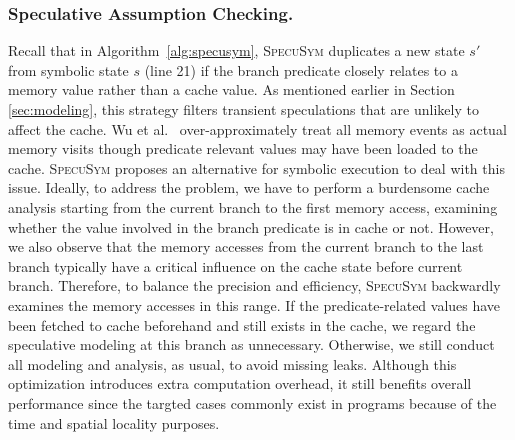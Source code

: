 \documentclass[sigconf]{acmart}
\newcommand\ignore[1]{}
\newcommand{\SpecuSym}{\textsc{SpecuSym} }
\begin{document}
\subsubsection{Speculative Assumption Checking.}
Recall that in Algorithm~\ref{alg:specusym}, \SpecuSym duplicates a new state 
$s'$ from symbolic state $s$ (line 21) if the branch predicate closely relates 
to a memory value rather than a cache value. As mentioned earlier in Section
\ref{sec:modeling}, this strategy filters transient speculations that are unlikely 
to affect the cache. Wu et al.~\cite{WuW19} over-approximately treat all memory 
events as actual memory visits though predicate relevant values may have been 
loaded to the cache. \SpecuSym proposes an alternative for symbolic execution to 
deal with this issue. Ideally, to address the problem, we have to perform a 
burdensome cache analysis starting from the current branch to the first memory 
access, examining whether the value involved in the branch predicate is in cache 
or not. However, we also observe that the memory accesses from the current branch 
to the last branch typically have a critical influence on the cache state before 
current branch. Therefore, to balance the precision and efficiency, \SpecuSym 
backwardly examines the memory accesses in this range. If the predicate-related 
values have been fetched to cache beforehand and still exists in the cache, we 
regard the speculative modeling at this branch as unnecessary. Otherwise, we still 
conduct all modeling and analysis, as usual, to avoid missing leaks. Although this 
optimization introduces extra computation overhead, it still benefits overall 
performance since the targted cases commonly exist in programs because of the time 
and spatial locality purposes.


\ignore{
Besides, we also record 
instructions whose memory access has manifested leakage so that 
following analysis can directly skip these instructions and carries on. 
}

\ignore{
\textbf{Bound mis-prediction rate.}
Modern processor typically has a mis-prediction rate lower than 90\% 
\cite{} which means it's very uncommon that all prediction results are 
wrong. Therefore, we set up a bound of mis-prediction rate by selecting 
at most 10\% out of all speculative state trace for analysis. Only memory 
access in these traces will be considered while the others are ignored. 
Furthermore, instead of enumerating all combinations of selected traces, 
we only analyze part of them without losing accuracy according to following 
observation: using LRU policy, the nearer a memory access is, the more impact 
it has on cache state. Thus, we only analyze combinations of speculative 
state traces that share no common suffixes.
}
\end{document}
